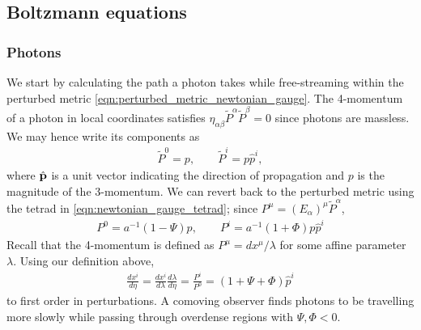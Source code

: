 \subsection{Boltzmann equations} \label{section:boltzmann_equations}
\subsubsection*{Photons}

We start by calculating the path a photon takes while free-streaming within the perturbed metric \eqref{eqn:perturbed_metric_newtonian_gauge}. The 4-momentum of a photon in local coordinates satisfies $\eta_{\alpha\beta}\tilde{P}^\alpha \tilde{P}^\beta = 0$ since photons are massless. We may hence write its components as
\begin{align}
	\tilde{P}^0 = p, \qquad \tilde{P}^i = p \hat{p}^i,
\end{align}
where $\hat{\mathbf{p}}$ is a unit vector indicating the direction of propagation and $p$ is the magnitude of the 3-momentum. We can revert back to the perturbed metric using the tetrad in \eqref{eqn:newtonian_gauge_tetrad}; since $P^\mu = (E_\alpha)^\mu \tilde{P}^\alpha$,
\begin{align}
	P^0 = a^{-1} (1 - \Psi)p, \qquad P^i = a^{-1}(1 + \Phi) p \hat{p}^i  \label{eqn:perturbed_photon_four_momentum}
\end{align}
Recall that the 4-momentum is defined as $P^\mu = dx^\mu/\lambda$ for some affine parameter $\lambda$. Using our definition above,
\begin{align}
	\frac{dx^i}{d\eta} =  \frac{dx^i}{d\lambda} \frac{d\lambda}{d\eta} = \frac{P^i}{P^0} = (1+\Psi+\Phi)\hat{p}^i	\label{eqn:perturbed_photon_position_total_derivative}
\end{align}
to first order in perturbations. A comoving observer finds photons to be travelling more slowly while passing through overdense regions with $\Psi,\Phi<0$.

